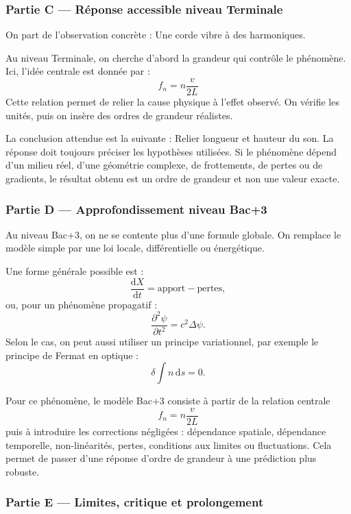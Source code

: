 \documentclass[11pt,a4paper]{article}
\begin{document}
\subsubsection*{Partie C — Réponse accessible niveau Terminale}

\begin{corrigebox}
On part de l'observation concrète : Une corde vibre à des harmoniques.

Au niveau Terminale, on cherche d'abord la grandeur qui contrôle le phénomène. Ici, l'idée centrale est donnée par :
\[
f_n=n\frac{v}{2L}
\]
Cette relation permet de relier la cause physique à l'effet observé. On vérifie les unités, puis on insère des ordres de grandeur réalistes.

La conclusion attendue est la suivante : Relier longueur et hauteur du son. La réponse doit toujours préciser les hypothèses utilisées. Si le phénomène dépend d'un milieu réel, d'une géométrie complexe, de frottements, de pertes ou de gradients, le résultat obtenu est un ordre de grandeur et non une valeur exacte.
\end{corrigebox}

\subsubsection*{Partie D — Approfondissement niveau Bac+3}

\begin{approfondissementbox}
Au niveau Bac+3, on ne se contente plus d'une formule globale. On remplace le modèle simple par une loi locale, différentielle ou énergétique.

Une forme générale possible est :
\[
\frac{\mathrm d X}{\mathrm dt}=\text{apport}-\text{pertes},
\]
ou, pour un phénomène propagatif :
\[
\frac{\partial^2 \psi}{\partial t^2}=c^2\Delta\psi.
\]
Selon le cas, on peut aussi utiliser un principe variationnel, par exemple le principe de Fermat en optique :
\[
\delta \int n\,\mathrm ds=0.
\]

Pour ce phénomène, le modèle Bac+3 consiste à partir de la relation centrale
\[
f_n=n\frac{v}{2L}
\]
puis à introduire les corrections négligées : dépendance spatiale, dépendance temporelle, non-linéarités, pertes, conditions aux limites ou fluctuations. Cela permet de passer d'une réponse d'ordre de grandeur à une prédiction plus robuste.
\end{approfondissementbox}

\subsubsection*{Partie E — Limites, critique et prolongement}
\end{document}

